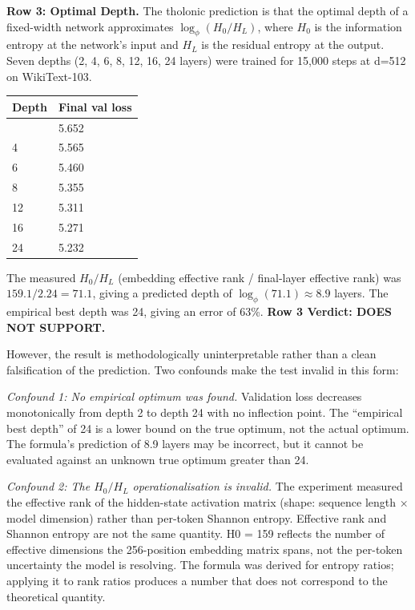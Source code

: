 \documentclass[12pt]{article}
\begin{document}
\textbf{Row 3: Optimal Depth.} The tholonic prediction is that the
optimal depth of a fixed-width network approximates
\(\log_\phi(H_0/H_L)\), where \(H_0\) is the information entropy at the
network's input and \(H_L\) is the residual entropy at the output. Seven
depths (2, 4, 6, 8, 12, 16, 24 layers) were trained for 15,000 steps at
d=512 on WikiText-103.

\begin{longtable}[]{@{}ll@{}}
\toprule\noalign{}
Depth & Final val loss \\
\midrule\noalign{}
\endhead
\bottomrule\noalign{}
\endlastfoot
2 & 5.652 \\
4 & 5.565 \\
6 & 5.460 \\
8 & 5.355 \\
12 & 5.311 \\
16 & 5.271 \\
24 & 5.232 \\
\end{longtable}

The measured \(H_0/H_L\) (embedding effective rank / final-layer
effective rank) was \(159.1 / 2.24 = 71.1\), giving a predicted depth of
\(\log_\phi(71.1) \approx 8.9\) layers. The empirical best depth was 24,
giving an error of 63\%. \textbf{Row 3 Verdict: DOES NOT SUPPORT.}

However, the result is methodologically uninterpretable rather than a
clean falsification of the prediction. Two confounds make the test
invalid in this form:

\emph{Confound 1: No empirical optimum was found.} Validation loss
decreases monotonically from depth 2 to depth 24 with no inflection
point. The ``empirical best depth'' of 24 is a lower bound on the true
optimum, not the actual optimum. The formula's prediction of 8.9 layers
may be incorrect, but it cannot be evaluated against an unknown true
optimum greater than 24.

\emph{Confound 2: The \(H_0/H_L\) operationalisation is invalid.} The
experiment measured the effective rank of the hidden-state activation
matrix (shape: sequence length × model dimension) rather than per-token
Shannon entropy. Effective rank and Shannon entropy are not the same
quantity. H0 = 159 reflects the number of effective dimensions the
256-position embedding matrix spans, not the per-token uncertainty the
model is resolving. The formula was derived for entropy ratios; applying
it to rank ratios produces a number that does not correspond to the
theoretical quantity.
\end{document}
